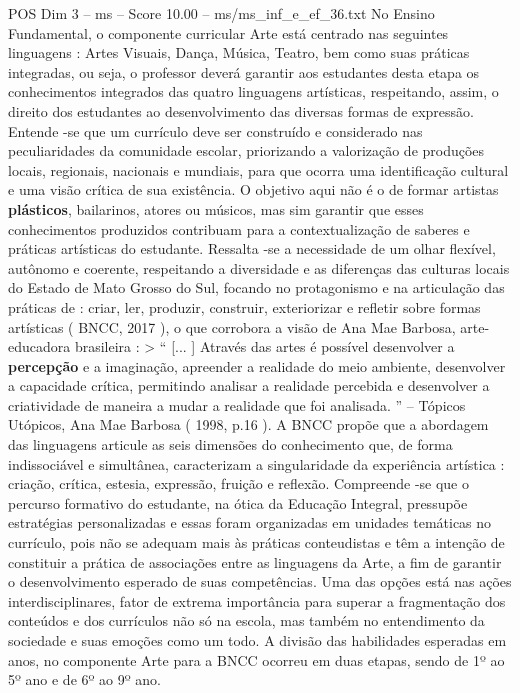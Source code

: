 \begin{textsample}{POS Dim 3 – ms – Score 10.00 – ms/ms\_inf\_e\_ef\_36.txt}
No Ensino Fundamental, o componente curricular Arte está centrado nas seguintes linguagens : Artes Visuais, Dança, Música, Teatro, bem como suas práticas integradas, ou seja, o professor deverá garantir aos estudantes desta etapa os conhecimentos integrados das quatro linguagens artísticas, respeitando, assim, o direito dos estudantes ao desenvolvimento das diversas formas de expressão.
Entende -se que um currículo deve ser construído e considerado nas peculiaridades da comunidade escolar, priorizando a valorização de produções locais, regionais, nacionais e mundiais, para que ocorra uma identificação cultural e uma visão crítica de sua existência.
O objetivo aqui não é o de formar artistas \textbf{plásticos}, bailarinos, atores ou músicos, mas sim garantir que esses conhecimentos produzidos contribuam para a contextualização de saberes e práticas artísticas do estudante.
Ressalta -se a necessidade de um olhar flexível, autônomo e coerente, respeitando a diversidade e as diferenças das culturas locais do Estado de Mato Grosso do Sul, focando no protagonismo e na articulação das práticas de : criar, ler, produzir, construir, exteriorizar e refletir sobre formas artísticas ( BNCC, 2017 ), o que corrobora a visão de Ana Mae Barbosa, arte-educadora brasileira : > “ [... ] Através das artes é possível desenvolver a \textbf{percepção} e a imaginação, apreender a realidade do meio ambiente, desenvolver a capacidade crítica, permitindo analisar a realidade percebida e desenvolver a criatividade de maneira a mudar a realidade que foi analisada. ” – Tópicos Utópicos, Ana Mae Barbosa ( 1998, p.16 ).
A BNCC propõe que a abordagem das linguagens articule as seis dimensões do conhecimento que, de forma indissociável e simultânea, caracterizam a singularidade da experiência artística : criação, crítica, estesia, expressão, fruição e reflexão.
Compreende -se que o percurso formativo do estudante, na ótica da Educação Integral, pressupõe estratégias personalizadas e essas foram organizadas em unidades temáticas no currículo, pois não se adequam mais às práticas conteudistas e têm a intenção de constituir a prática de associações entre as linguagens da Arte, a fim de garantir o desenvolvimento esperado de suas competências.
Uma das opções está nas ações interdisciplinares, fator de extrema importância para superar a fragmentação dos conteúdos e dos currículos não só na escola, mas também no entendimento da sociedade e suas emoções como um todo.
A divisão das habilidades esperadas em anos, no componente Arte para a BNCC ocorreu em duas etapas, sendo de 1º ao 5º ano e de 6º ao 9º ano.

\end{textsample}
